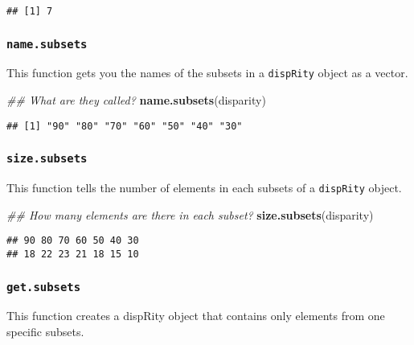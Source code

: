 \documentclass[
]{book}
\newenvironment{Shaded}{\begin{snugshade}}{\end{snugshade}}
\newcommand{\CommentTok}[1]{\textcolor[rgb]{0.56,0.35,0.01}{\textit{#1}}}
\newcommand{\KeywordTok}[1]{\textcolor[rgb]{0.13,0.29,0.53}{\textbf{#1}}}
\newcommand{\NormalTok}[1]{#1}
\begin{document}
\begin{verbatim}
## [1] 7
\end{verbatim}

\hypertarget{name.subsets}{%
\subsubsection{\texorpdfstring{\texttt{name.subsets}}{name.subsets}}\label{name.subsets}}

This function gets you the names of the subsets in a \texttt{dispRity} object as a vector.

\begin{Shaded}
\begin{Highlighting}[]
\CommentTok{\#\# What are they called?}
\KeywordTok{name.subsets}\NormalTok{(disparity)}
\end{Highlighting}
\end{Shaded}

\begin{verbatim}
## [1] "90" "80" "70" "60" "50" "40" "30"
\end{verbatim}

\hypertarget{size.subsets}{%
\subsubsection{\texorpdfstring{\texttt{size.subsets}}{size.subsets}}\label{size.subsets}}

This function tells the number of elements in each subsets of a \texttt{dispRity} object.

\begin{Shaded}
\begin{Highlighting}[]
\CommentTok{\#\# How many elements are there in each subset?}
\KeywordTok{size.subsets}\NormalTok{(disparity)}
\end{Highlighting}
\end{Shaded}

\begin{verbatim}
## 90 80 70 60 50 40 30 
## 18 22 23 21 18 15 10
\end{verbatim}

\hypertarget{get.subsets}{%
\subsubsection{\texorpdfstring{\texttt{get.subsets}}{get.subsets}}\label{get.subsets}}

This function creates a dispRity object that contains only elements from one specific subsets.
\end{document}
